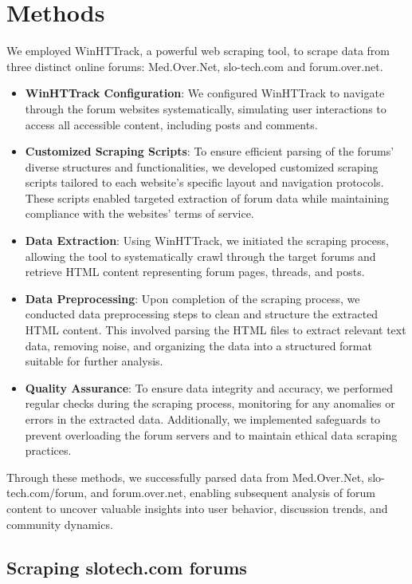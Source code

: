 \documentclass[fleqn,moreauthors,10pt]{ds_report}
\begin{document}

\section*{Methods}

We employed WinHTTrack, a powerful web scraping tool, to scrape data from three distinct online forums: Med.Over.Net, slo-tech.com and forum.over.net.


\begin{itemize}
    \item \textbf{WinHTTrack Configuration}: We configured WinHTTrack to navigate through the forum websites systematically, simulating user interactions to access all accessible content, including posts and comments.
    \item \textbf{Customized Scraping Scripts}: To ensure efficient parsing of the forums' diverse structures and functionalities, we developed customized scraping scripts tailored to each website's specific layout and navigation protocols. These scripts enabled targeted extraction of forum data while maintaining compliance with the websites' terms of service.
    \item \textbf{Data Extraction}: Using WinHTTrack, we initiated the scraping process, allowing the tool to systematically crawl through the target forums and retrieve HTML content representing forum pages, threads, and posts.
\item \textbf{Data Preprocessing}: Upon completion of the scraping process, we conducted data preprocessing steps to clean and structure the extracted HTML content. This involved parsing the HTML files to extract relevant text data, removing noise, and organizing the data into a structured format suitable for further analysis.
\item \textbf{Quality Assurance}: To ensure data integrity and accuracy, we performed regular checks during the scraping process, monitoring for any anomalies or errors in the extracted data. Additionally, we implemented safeguards to prevent overloading the forum servers and to maintain ethical data scraping practices.
\end{itemize}
Through these methods, we successfully parsed data from Med.Over.Net, slo-tech.com/forum, and forum.over.net, enabling subsequent analysis of forum content to uncover valuable insights into user behavior, discussion trends, and community dynamics.

\subsection{Scraping slo\-tech.com forums}
\end{document}
